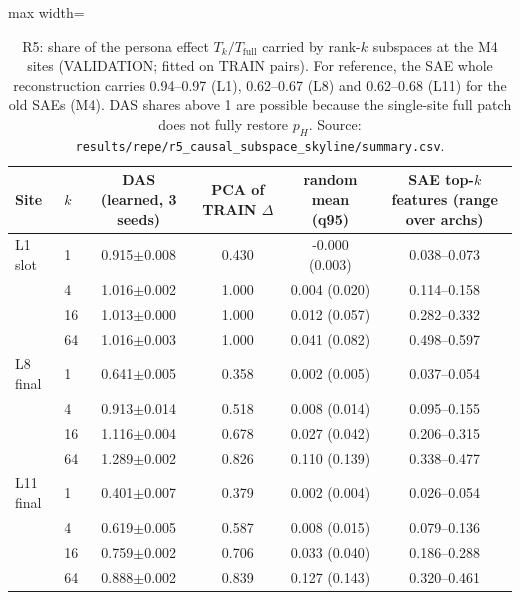 \begin{table}[t]
\centering
\small
\caption{R5: share of the persona effect $T_k/T_{\text{full}}$ carried by rank-$k$ subspaces at the M4 sites (VALIDATION; fitted on TRAIN pairs). For reference, the SAE whole reconstruction carries 0.94--0.97 (L1), 0.62--0.67 (L8) and 0.62--0.68 (L11) for the old SAEs (M4). DAS shares above 1 are possible because the single-site full patch does not fully restore $p_H$. Source: \texttt{results/\allowbreak{}repe/\allowbreak{}r5\_causal\_subspace\_skyline/\allowbreak{}summary.csv}.}
\label{tab:r5}
\begin{adjustbox}{max width=\linewidth}
\begin{tabular}{llcccc}
\toprule
Site & $k$ & DAS (learned, 3 seeds) & PCA of TRAIN $\Delta$ & random mean (q95) & SAE top-$k$ features (range over archs) \\
\midrule
L1 slot & 1 & 0.915$\pm$0.008 & 0.430 & -0.000 (0.003) & 0.038--0.073 \\
 & 4 & 1.016$\pm$0.002 & 1.000 & 0.004 (0.020) & 0.114--0.158 \\
 & 16 & 1.013$\pm$0.000 & 1.000 & 0.012 (0.057) & 0.282--0.332 \\
 & 64 & 1.016$\pm$0.003 & 1.000 & 0.041 (0.082) & 0.498--0.597 \\
\midrule
L8 final & 1 & 0.641$\pm$0.005 & 0.358 & 0.002 (0.005) & 0.037--0.054 \\
 & 4 & 0.913$\pm$0.014 & 0.518 & 0.008 (0.014) & 0.095--0.155 \\
 & 16 & 1.116$\pm$0.004 & 0.678 & 0.027 (0.042) & 0.206--0.315 \\
 & 64 & 1.289$\pm$0.002 & 0.826 & 0.110 (0.139) & 0.338--0.477 \\
\midrule
L11 final & 1 & 0.401$\pm$0.007 & 0.379 & 0.002 (0.004) & 0.026--0.054 \\
 & 4 & 0.619$\pm$0.005 & 0.587 & 0.008 (0.015) & 0.079--0.136 \\
 & 16 & 0.759$\pm$0.002 & 0.706 & 0.033 (0.040) & 0.186--0.288 \\
 & 64 & 0.888$\pm$0.002 & 0.839 & 0.127 (0.143) & 0.320--0.461 \\
\bottomrule
\end{tabular}
\end{adjustbox}
\end{table}
